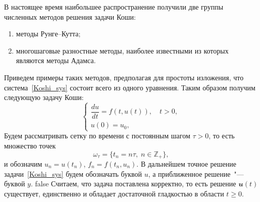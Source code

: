 \documentclass[11pt,a4paper,twoside]{report}
\numberwithin{equation}{section}
\theoremstyle{definition}
\theoremstyle{plain}
\newcommand{\vfunc}[1]{\mathbfit{#1}}
\begin{document}
В настоящее время наибольшее распространение получили две группы численных
методов решения задачи Коши:
%
\begin{enumerate}
    \item методы Рунге--Кутта;
    \item многошаговые разностные методы, наиболее известными из которых являются
        методы Адамса.
\end{enumerate}
%
Приведем примеры таких методов, предполагая для простоты изложения, что
система~\eqref{Koshi_sys} состоит всего из одного уравнения. Таким образом
получим следующую задачу Коши:
\begin{equation}
%
    \label{Koshi}
    \begin{cases}
        \dfrac{du}{dt} = f(t, u(t)), \quad t > 0, \\
        u(0) = u_0,
    \end{cases}
\end{equation}
Будем рассматривать
сетку по времени с постоянным шагом $\tau > 0$, то есть множество точек
%
$$
    \omega_\tau = \{t_n = n\tau,\;n \in \mathbb{Z}_+\},
$$
%
и обозначим $u_n = u(t_n)$, $f_n = f(t_n, u_n)$.
В дальнейшем точное решение задачи~\eqref{Koshi_sys} будем обозначать буквой $u$,
а приближенное решение~"--- буквой $y$.
\ifx false
Считаем, что задача поставлена корректно, то есть решение $\vfunc{u}(t)$ существует, единственно
и обладает достаточной гладкостью в области $t\geqslant 0$.
\end{document}
